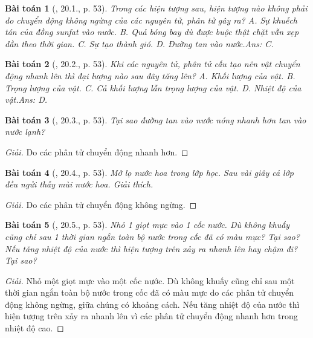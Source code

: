 \documentclass{article}
\newtheorem{baitoan}{Bài toán}
\begin{document}
\begin{baitoan}[\cite{SBT_Vat_Ly_8}, 20.1., p. 53]
	Trong các hiện tượng sau, hiện tượng nào không phải do chuyển động không ngừng của các nguyên tử, phân tử gây ra? {\sf A.} Sự khuếch tán của đồng sunfat vào nước. {\sf B.} Quả bóng bay dù được buộc thật chặt vẫn xẹp dần theo thời gian. {\sf C.} Sự tạo thành gió. {\sf D.} Đường tan vào nước.\hfill{\sf Ans: C.}
\end{baitoan}

\begin{baitoan}[\cite{SBT_Vat_Ly_8}, 20.2., p. 53]
	Khi các nguyên tử, phân tử cấu tạo nên vật chuyển động nhanh lên thì đại lượng nào sau đây tăng lên? {\sf A.} Khối lượng của vật. {\sf B.} Trọng lượng của vật. {\sf C.} Cả khối lượng lẫn trọng lượng của vật. {\sf D.} Nhiệt độ của vật.\hfill{\sf Ans: D.}
\end{baitoan}

\begin{baitoan}[\cite{SBT_Vat_Ly_8}, 20.3., p. 53]
	Tại sao đường tan vào nước nóng nhanh hơn tan vào nước lạnh?
\end{baitoan}

\begin{proof}[Giải]
	Do các phân tử chuyển động nhanh hơn.
\end{proof}

\begin{baitoan}[\cite{SBT_Vat_Ly_8}, 20.4., p. 53]
	Mở lọ nước hoa trong lớp học. Sau vài giây cả lớp đều ngửi thấy mùi nước hoa. Giải thích.
\end{baitoan}

\begin{proof}[Giải]
	Do các phân tử chuyển động không ngừng.
\end{proof}

\begin{baitoan}[\cite{SBT_Vat_Ly_8}, 20.5., p. 53]
	Nhỏ 1 giọt mực vào 1 cốc nước. Dù không khuấy cũng chỉ sau 1 thời gian ngắn toàn bộ nước trong cốc đã có màu mực? Tại sao? Nếu tăng nhiệt độ của nước thì hiện tượng trên xảy ra nhanh lên hay chậm đi? Tại sao?
\end{baitoan}

\begin{proof}[Giải]
	Nhỏ một giọt mực vào một cốc nước. Dù không khuấy cũng chỉ sau một thời gian ngắn toàn bộ nước trong cốc đã có màu mực do các phân tử chuyển động không ngừng, giữa chúng có khoảng cách. Nếu tăng nhiệt độ của nước thì hiện tượng trên xảy ra nhanh lên vì các phân tử chuyển động nhanh hơn trong nhiệt độ cao.	
\end{proof}
\end{document}
